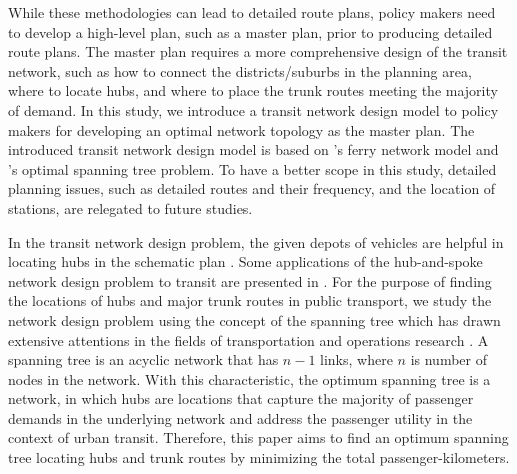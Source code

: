 \documentclass[10pt,english]{article}
\begin{document}
While these methodologies can lead to detailed route plans, policy
makers need to develop a high-level plan, such as a master plan, prior
to producing detailed route plans. The master plan requires a more
comprehensive design of the transit network, such as how to connect the
districts/suburbs in the planning area, where to locate hubs, and where
to place the trunk routes meeting the majority of demand. In this study,
we introduce a transit network design model to policy makers for
developing an optimal network topology as the master plan. The
introduced transit network design model is based on \citet{Bell2020}'s
ferry network model and \citet{Rothlauf2009}'s optimal spanning tree problem.
To have a better scope in this study, detailed planning issues, such as
detailed routes and their frequency, and the location of stations, are
relegated to future studies.

In the transit network design problem, the given depots of vehicles are
helpful in locating hubs in the schematic plan \citep{Guihaire2010, Sun2019}. Some applications of the hub-and-spoke network
design problem to transit are presented in \citet{Alibeyg2016, Huang2018, Wang2012}. For the purpose of finding the
locations of hubs and major trunk routes in public transport, we study
the network design problem using the concept of the spanning tree which
has drawn extensive attentions in the fields of transportation and
operations research \citep{Ahuja1987, Bai2022, Bell2020, Contreras2009, Contreras2010, Hu1974, Kayisoglu2021, Lin2008, Rothlauf2009, Tilk2018, Wei2014, Zetina2019}. A spanning tree is an acyclic network
that has $n - 1$ links, where $n$ is number of nodes in the network.
With this characteristic, the optimum spanning tree is a network, in
which hubs are locations that capture the majority of passenger demands
in the underlying network and address the passenger utility in the
context of urban transit. Therefore, this paper aims to find an optimum
spanning tree locating hubs and trunk routes by minimizing the total
passenger-kilometers.
\end{document}
